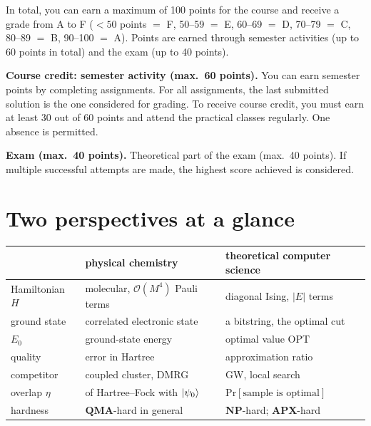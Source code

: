 \documentclass[overheadsbeamer.tex]{subfiles}
\begin{document}
\begin{frame}
In total, you can earn a maximum of 100 points for the course and receive a grade from A to F ($<50$ points $=$ F, 50--59 $=$ E, 60--69 $=$ D, 70--79 $=$ C, 80--89 $=$ B, 90--100 $=$ A).
Points are earned through semester activities (up to 60 points in total) and the exam (up to 40 points).

\textbf{Course credit: semester activity (max.\ 60 points).}
You can earn semester points by completing assignments.
For all assignments, the last submitted solution is the one considered for grading.
To receive course credit, you must earn at least 30 out of 60 points and attend the practical classes regularly. One absence is permitted.

\textbf{Exam (max.\ 40 points).}
Theoretical part of the exam (max.\ 40 points). If multiple successful attempts are made, the highest score achieved is considered.
\end{frame}

\section{Two perspectives at a glance}

\begin{frame}
\onp{\scriptsize}
\begin{center}\ona{\small}
\begin{tabular}{lll}\toprule
 & physical chemistry & theoretical computer science \\\midrule
Hamiltonian $H$ & molecular, $\mathcal O(M^4)$ Pauli terms & diagonal Ising, $|E|$ terms \\
ground state & correlated electronic state & a bitstring, the optimal cut \\
$E_0$ & ground-state energy & optimal value $\mathrm{OPT}$ \\
quality & error in Hartree & approximation ratio \\
competitor & coupled cluster, DMRG & GW, local search \\
overlap $\eta$ & of Hartree--Fock with $\ket{\psi_0}$ & $\mathrm{Pr}[\text{sample is optimal}]$ \\
hardness & $\mathbf{QMA}$-hard in general & $\mathbf{NP}$-hard; $\mathbf{APX}$-hard \\\bottomrule
\end{tabular}
\end{center}
\end{frame}
\end{document}
